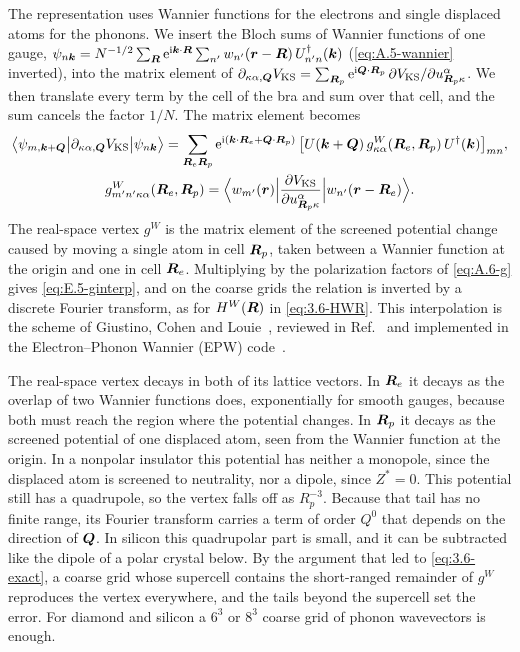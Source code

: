 The representation uses Wannier functions for the electrons and single displaced atoms for the phonons. We insert the Bloch sums of Wannier functions of one gauge, $\psi_{n\bm{k}} = N^{-1/2}\sum_{\bm{R}}\mathrm{e}^{\mathrm{i}\bm{k}\cdot\bm{R}}\sum_{n'}w_{n'}(\bm{r} - \bm{R})\,U^\dagger_{n'n}(\bm{k})$ (\cref{eq:A.5-wannier} inverted), into the matrix element of $\partial_{\kappa\alpha,\bm{Q}}V_{\mathrm{KS}} = \sum_{\bm{R}_p}\mathrm{e}^{\mathrm{i}\bm{Q}\cdot\bm{R}_p}\,\partial V_{\mathrm{KS}}/\partial u^\alpha_{\bm{R}_p\kappa}$. We then translate every term by the cell of the bra and sum over that cell, and the sum cancels the factor $1/N$. The matrix element becomes
\begin{gather}
  \bigl\langle\psi_{m,\bm{k}+\bm{Q}}\bigr|\partial_{\kappa\alpha,\bm{Q}}V_{\mathrm{KS}}\bigl|\psi_{n\bm{k}}\bigr\rangle
  = \sum_{\bm{R}_e\bm{R}_p}\mathrm{e}^{\mathrm{i}(\bm{k}\cdot\bm{R}_e + \bm{Q}\cdot\bm{R}_p)}\,
  \bigl[U(\bm{k}+\bm{Q})\,g^W_{\kappa\alpha}(\bm{R}_e,\bm{R}_p)\,U^\dagger(\bm{k})\bigr]_{mn} ,
  \nonumber\\
  g^W_{m'n'\kappa\alpha}(\bm{R}_e,\bm{R}_p) = \Bigl\langle w_{m'}(\bm{r})\Bigr|\frac{\partial V_{\mathrm{KS}}}{\partial u^\alpha_{\bm{R}_p\kappa}}\Bigl|w_{n'}(\bm{r} - \bm{R}_e)\Bigr\rangle .
  \label{eq:6.2-gW}
\end{gather}
The real-space vertex $g^W$ is the matrix element of the screened potential change caused by moving a single atom in cell $\bm{R}_p$, taken between a Wannier function at the origin and one in cell $\bm{R}_e$. Multiplying by the polarization factors of \cref{eq:A.6-g} gives \cref{eq:E.5-ginterp}, and on the coarse grids the relation is inverted by a discrete Fourier transform, as for $H^W(\bm{R})$ in \cref{eq:3.6-HWR}. This interpolation is the scheme of Giustino, Cohen and Louie~\cite{giustino2007electron}, reviewed in Ref.~\cite[Eqs.~(177)--(179)]{giustino2017electron} and implemented in the Electron--Phonon Wannier (EPW) code~\cite{ponce2016epw}.

The real-space vertex decays in both of its lattice vectors. In $\bm{R}_e$ it decays as the overlap of two Wannier functions does, exponentially for smooth gauges, because both must reach the region where the potential changes. In $\bm{R}_p$ it decays as the screened potential of one displaced atom, seen from the Wannier function at the origin. In a nonpolar insulator this potential has neither a monopole, since the displaced atom is screened to neutrality, nor a dipole, since $Z^* = 0$. This potential still has a quadrupole, so the vertex falls off as $R_p^{-3}$. Because that tail has no finite range, its Fourier transform carries a term of order $Q^0$ that depends on the direction of $\bm{Q}$. In silicon this quadrupolar part is small, and it can be subtracted like the dipole of a polar crystal below. By the argument that led to \cref{eq:3.6-exact}, a coarse grid whose supercell contains the short-ranged remainder of $g^W$ reproduces the vertex everywhere, and the tails beyond the supercell set the error. For diamond and silicon a $6^3$ or $8^3$ coarse grid of phonon wavevectors is enough.

